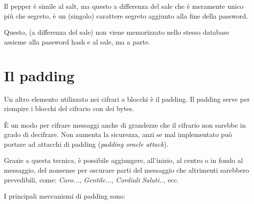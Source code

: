   

\textsf{\small Il pepper è simile al salt, ma questo a differenza del sale che è meramente unico più che segreto, è un (singolo) carattere segreto aggiunto alla fine della password.} %

 

\textsf{\small Questo, (a differenza del sale) non viene memorizzato nello stesso database assieme alla password hash e al sale, ma a parte.}


\section{Il padding}


\textsf{\small Un altro elemento utilizzato nei cifrari a blocchi è il padding. }
\textsf{\small Il padding serve per riempire i blocchi del cifrario con dei bytes.}


\textsf{\small È un modo per cifrare messaggi anche di grandezze che il cifrario non sarebbe in grado di decifrare.}
\textsf{\small Non aumenta la sicurezza, anzi se mal implementato può portare ad attacchi di padding (\emph{padding oracle attack}).} %

\textsf{\small Grazie a questa tecnica, è possibile aggiungere, all'inizio, al centro o in fondo al messaggio, del nonsense per oscurare parti del messaggio che altrimenti sarebbero prevedibili, come: \emph{Caro...}, \emph{Gentile...}, \emph{Cordiali Saluti..}, ecc.}

\textsf{\small I principali meccanismi di padding sono: }

      


